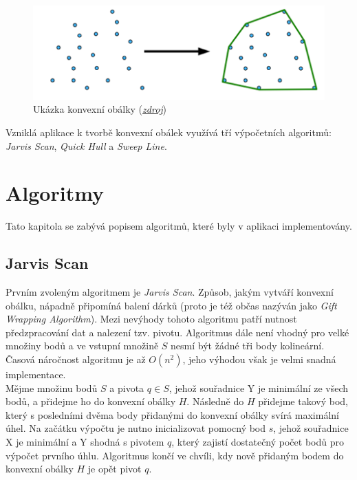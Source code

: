 \documentclass[a4paper, 12pt]{article}
\begin{document}
\begin{figure}[h!]
	\centering
	\includegraphics[width=13cm]{./pictures/ch.png}
	\caption{Ukázka konvexní obálky (\href{http://mind.cs.byu.edu/courses/312/projects/project2_files/ConvexHull_python.php}{\textsl{zdroj}})}
\end{figure}

Vzniklá aplikace k tvorbě konvexní obálek využívá tří výpočetních algoritmů: \textit{Jarvis Scan}, \textit{Quick Hull} a \textit{Sweep Line}.

\section{Algoritmy}
Tato kapitola se zabývá popisem algoritmů, které byly v aplikaci implementovány. 

\subsection{Jarvis Scan}
Prvním zvoleným algoritmem je \textit{Jarvis Scan}. Způsob, jakým vytváří konvexní obálku, nápadně připomíná balení dárků (proto je též občas nazýván jako \textit{Gift Wrapping Algorithm}). Mezi nevýhody tohoto algoritmu patří nutnost předzpracování dat a nalezení tzv. pivotu. Algoritmus dále není vhodný pro velké množiny bodů a ve vstupní množině $S$ nesmí být žádné tři body kolineární. Časová náročnost algoritmu je až $O(n^2)$, jeho výhodou však je velmi snadná implementace.\\

Mějme množinu bodů $S$ a pivota $q \in S$, jehož souřadnice Y je minimální ze všech bodů, a přidejme ho do konvexní obálky $H$. Následně do $H$ přidejme takový bod, který s posledními dvěma body přidanými do konvexní obálky svírá maximální úhel. Na začátku výpočtu je nutno inicializovat pomocný bod $s$, jehož souřadnice X je minimální a Y shodná s pivotem $q$, který zajistí dostatečný počet bodů pro výpočet prvního úhlu. Algoritmus končí ve chvíli, kdy nově přidaným bodem do konvexní obálky $H$ je opět pivot $q$. \\
\end{document}
